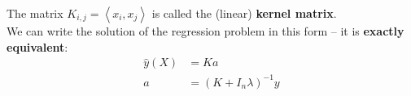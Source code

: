 The matrix $K_{i,j}=\left\langle x_i,x_j \right\rangle$ is called the (linear) \textbf{kernel matrix}. \\
We can write the solution of the regression problem in this form -- it is \textbf{exactly equivalent}:
\begin{align*}
\hat{y}(X)&= Ka \\ 
a &=  (K+{I}_n\lambda)^{-1}y
\end{align*}

